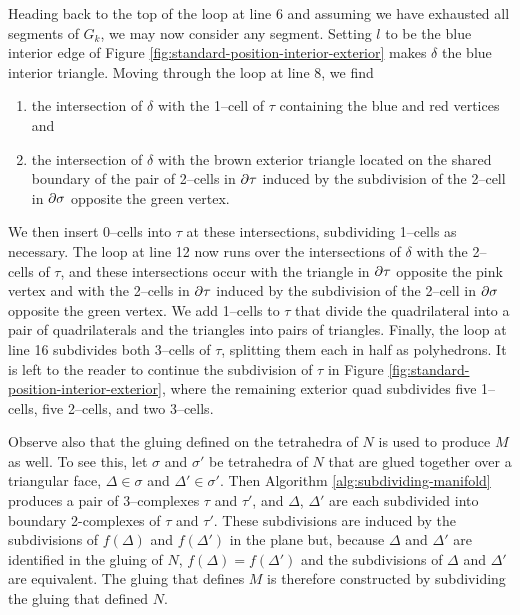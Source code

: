 Heading back to the top of the loop at line 6 and assuming we have exhausted all segments of $G_k$, we may now consider any segment.
Setting $l$ to be the blue interior edge of Figure \ref{fig:standard-position-interior-exterior} makes $\delta$ the blue interior triangle.
Moving through the loop at line 8, we find
\begin{enumerate}
	\item the intersection of $\delta$ with the 1--cell of $\tau$ containing the blue and red vertices and 
	\item the intersection of $\delta$ with the brown exterior triangle located on the shared boundary of the pair of 2--cells in $\partial\tau$ induced by the subdivision of the 2--cell in $\partial\sigma$ opposite the green vertex.
\end{enumerate}
We then insert 0--cells into $\tau$ at these intersections, subdividing 1--cells as necessary.
The loop at line 12 now runs over the intersections of $\delta$ with the 2--cells of $\tau$, and these intersections occur with the triangle in $\partial\tau$ opposite the pink vertex and with the 2--cells in $\partial\tau$ induced by the subdivision of the 2--cell in $\partial\sigma$ opposite the green vertex.
We add 1--cells to $\tau$ that divide the quadrilateral into a pair of quadrilaterals and the triangles into pairs of triangles.
Finally, the loop at line 16 subdivides both 3--cells of $\tau$, splitting them each in half as polyhedrons.
It is left to the reader to continue the subdivision of $\tau$ in Figure \ref{fig:standard-position-interior-exterior}, where the remaining exterior quad subdivides five 1--cells, five 2--cells, and two 3--cells.

Observe also that the gluing defined on the tetrahedra of $N$ is used to produce $M$ as well.
To see this, let $\sigma$ and $\sigma'$ be tetrahedra of $N$ that are glued together over a triangular face, $\Delta\in\sigma$ and $\Delta'\in\sigma'$.
Then Algorithm \ref{alg:subdividing-manifold} produces a pair of 3--complexes $\tau$ and $\tau'$, and $\Delta$, $\Delta'$ are each subdivided into boundary 2-complexes of $\tau$ and $\tau'$.
These subdivisions are induced by the subdivisions of $f(\Delta)$ and $f(\Delta')$ in the plane but, because $\Delta$ and $\Delta'$ are identified in the gluing of $N$, $f(\Delta)=f(\Delta')$ and the subdivisions of $\Delta$ and $\Delta'$ are equivalent.
The gluing that defines $M$ is therefore constructed by subdividing the gluing that defined $N$.

